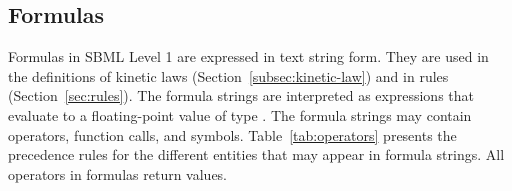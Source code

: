 \documentclass[10pt]{cekarticle}
\newcommand{\vref}[1]{\ref{#1}}
\begin{document}
\subsection{Formulas}
\label{sec:formulas}

Formulas in SBML Level 1 are expressed in text string form.  They are used
in the definitions of kinetic laws (Section~\ref{subsec:kinetic-law}) and
in rules (Section~\ref{sec:rules}).  The formula strings are interpreted as
expressions that evaluate to a floating-point value of type .
The formula strings may contain operators, function calls, and symbols.
Table~\vref{tab:operators} presents the precedence rules
for the different entities that may appear in formula strings.  All
operators in formulas return  values.
\end{document}
